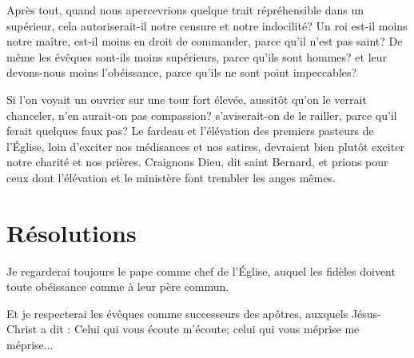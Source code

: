\documentclass[instructions.tex]{subfiles}
\begin{document}
Après tout, quand nous apercevrions quelque trait répréhensible dans un supérieur, cela autoriserait-il notre censure et notre indocilité? Un roi est-il moins notre maître, est-il moins en droit de commander, parce qu'il n'est pas saint? De même les évêques sont-ils moins supérieurs, parce qu'ils sont hommes? et leur devons-nous moins l'obéissance, parce qu'ils ne sont point impeccables?
 
Si l'on voyait un ouvrier sur une tour fort élevée, aussitôt qu'on le verrait chanceler, n'en aurait-on pas compassion? s'aviserait-on de le railler, parce qu'il ferait quelques faux pas? Le fardeau et l'élévation des premiers pasteurs de l'Église, loin d'exciter nos médisances et nos satires, devraient bien plutôt exciter notre charité et nos prières. Craignons Dieu, dit saint Bernard, et prions pour ceux dont l'élévation et le ministère font trembler les anges mêmes.
 
\section{Résolutions}
 
\primo Je regarderai toujours le pape comme chef de l'Église, auquel les fidèles doivent toute obéissance comme à leur père commun.
 
\secundo Et je respecterai les évêques comme successeurs des apôtres, auxquels Jésus-Christ a dit : Celui qui vous écoute m'écoute; celui qui vous méprise me méprise... 

 
\end{document}
